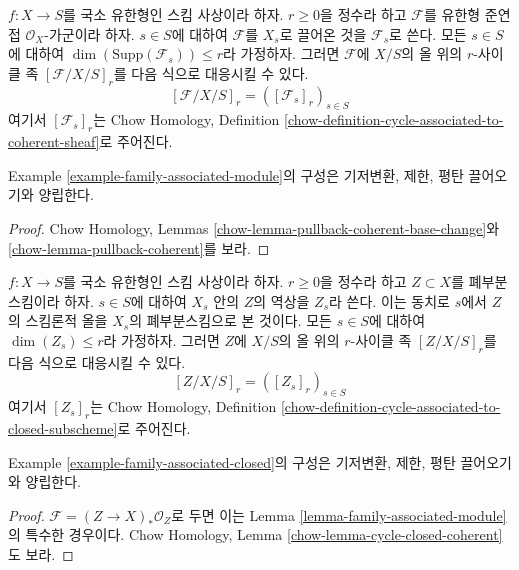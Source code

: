 \begin{example}
\label{example-family-associated-module}
$f : X \to S$를 국소 유한형인 스킴 사상이라 하자.
$r \geq 0$을 정수라 하고 $\mathcal{F}$를 유한형 준연접
$\mathcal{O}_X$-가군이라 하자. $s \in S$에 대하여 $\mathcal{F}$를
$X_s$로 끌어온 것을 $\mathcal{F}_s$로 쓴다. 모든 $s \in S$에
대하여 $\dim(\text{Supp}(\mathcal{F}_s)) \leq r$라 가정하자.
그러면 $\mathcal{F}$에 $X/S$의 올 위의 $r$-사이클 족
$[\mathcal{F}/X/S]_r$를 다음 식으로 대응시킬 수 있다.
$$
[\mathcal{F}/X/S]_r = ([\mathcal{F}_s]_r)_{s \in S}
$$
여기서 $[\mathcal{F}_s]_r$는 Chow Homology, Definition
\ref{chow-definition-cycle-associated-to-coherent-sheaf}로 주어진다.
\end{example}

\begin{lemma}
\label{lemma-family-associated-module}
Example \ref{example-family-associated-module}의 구성은 기저변환,
제한, 평탄 끌어오기와 양립한다.
\end{lemma}

\begin{proof}
Chow Homology, Lemmas
\ref{chow-lemma-pullback-coherent-base-change}와
\ref{chow-lemma-pullback-coherent}를 보라.
\end{proof}

\begin{example}
\label{example-family-associated-closed}
$f : X \to S$를 국소 유한형인 스킴 사상이라 하자.
$r \geq 0$을 정수라 하고 $Z \subset X$를 폐부분스킴이라 하자.
$s \in S$에 대하여 $X_s$ 안의 $Z$의 역상을 $Z_s$라 쓴다.
이는 동치로 $s$에서 $Z$의 스킴론적 올을 $X_s$의 폐부분스킴으로
본 것이다. 모든 $s \in S$에 대하여 $\dim(Z_s) \leq r$라 가정하자.
그러면 $Z$에 $X/S$의 올 위의 $r$-사이클 족 $[Z/X/S]_r$를
다음 식으로 대응시킬 수 있다.
$$
[Z/X/S]_r = ([Z_s]_r)_{s \in S}
$$
여기서 $[Z_s]_r$는 Chow Homology, Definition
\ref{chow-definition-cycle-associated-to-closed-subscheme}로 주어진다.
\end{example}

\begin{lemma}
\label{lemma-family-associated-closed}
Example \ref{example-family-associated-closed}의 구성은 기저변환,
제한, 평탄 끌어오기와 양립한다.
\end{lemma}

\begin{proof}
$\mathcal{F} = (Z \to X)_*\mathcal{O}_Z$로 두면 이는
Lemma \ref{lemma-family-associated-module}의 특수한 경우이다.
Chow Homology, Lemma \ref{chow-lemma-cycle-closed-coherent}도 보라.
\end{proof}

